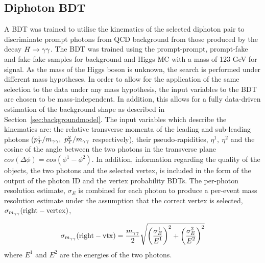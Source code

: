 \subsection{Diphoton BDT}
\label{sec:diphotonbdt}
A BDT was trained to utilise the kinematics of the selected diphoton pair to discriminate prompt photons
from QCD background from those produced by the decay $H\rightarrow\gamma\gamma$. The BDT was trained using the prompt-prompt, prompt-fake
and fake-fake samples for background and Higgs MC with a mass of 123 GeV for signal.
As the mass of the Higgs boson is unknown, the search is performed under different mass hypotheses.
In order to allow for the application of the same selection to the data under any mass hypothesis,
the input variables to the BDT are chosen to be mass-independent. In addition, this allows
for a fully data-driven estimation of the background shape as described in Section~\ref{sec:backgroundmodel}.
The input variables which describe the kinematics are:
the relative transverse momenta of the leading and sub-leading photons ($p_{T}^{1}/m_{\gamma\gamma},~p_{T}^{2}/m_{\gamma\gamma}$ respectively), 
their pseudo-rapidities, $\eta^{1},~\eta^{2}$ and the cosine of the 
angle between the two photons in the transverse plane $cos(\Delta\phi)=cos(\phi^{1}-\phi^{2})$.
In addition, information regarding the quality
of the objects, the two photons and the selected vertex, is included in the form of the output of the 
photon ID and the vertex probability BDTs. The per-photon resolution estimate, $\sigma_{E}$ is combined for
each photon to produce a per-event mass resolution estimate under the assumption that 
the correct vertex is selected, $\sigma_{m_{\gamma\gamma}}(\mathrm{right-vertex})$,

\begin{equation}
\sigma_{m_{\gamma\gamma}} (\mathrm{right-vtx}) = \frac{\displaystyle m_{\gamma\gamma}}{\displaystyle 2} 
\sqrt{ \left( \frac{\displaystyle {\sigma_{E}^{1}}}{\displaystyle E^{1} } \right)^{2}
     + \left( \frac{\displaystyle {\sigma_{E}^{2}}}{\displaystyle E^{2} } \right)^{2}
     }
\end{equation}
where $E^{1}$ and $E^{2}$ are the energies of the two photons.


